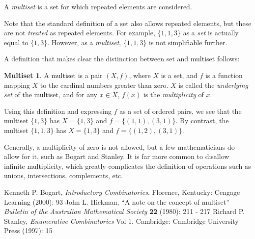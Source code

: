 \documentclass{article}
\theoremstyle{definition}
\newtheorem*{defn}{Multiset}
\begin{document}
A \emph{multiset} is a set for which repeated elements are considered.

Note that the standard definition of a set also allows repeated elements, but these are not \emph{treated} as repeated elements.  For example, $\{1,1,3\}$ as a \emph{set} is actually equal to $\{1,3\}$. However, as a \emph{multiset}, $\{1,1,3\}$ is not simplifiable further.

A definition that makes clear the distinction between set and multiset follows:

\begin{defn}
A multiset is a pair $(X, f)$, where $X$ is a set, and $f$ is a function mapping $X$ to the cardinal numbers greater than zero.  $X$ is called the \emph{underlying set} of the multiset, and for any $x \in X$, $f(x)$ is the \emph{multiplicity} of $x$.
\end{defn}

Using this definition and expressing $f$ as a set of ordered pairs, we see that the multiset $\{1,3\}$ has $X = \{1,3\}$ and $f = \{(1,1),(3,1)\}$.  By contrast, the multiset $\{1,1,3\}$  has $X = \{1,3\}$  and $f = \{(1,2),(3,1)\}$.

Generally, a multiplicity of zero is not allowed, but a few mathematicians do allow for it, such as Bogart and Stanley. It is far more common to disallow infinite multiplicity, which greatly complicates the definition of operations such as unions, intersections, complements, etc.

\begin{thebibliography}{3}
 Kenneth P. Bogart, {\it Introductory Combinatorics}. Florence, Kentucky: Cengage Learning (2000): 93
 John L. Hickman, ``A note on the concept of multiset'' {\it Bulletin of the Australian Mathematical Society}  {\bf 22} (1980): 211 - 217
 Richard P. Stanley, {\it Enumerative Combinatorics} Vol 1. Cambridge: Cambridge University Press (1997): 15
\end{thebibliography}
\end{document}
